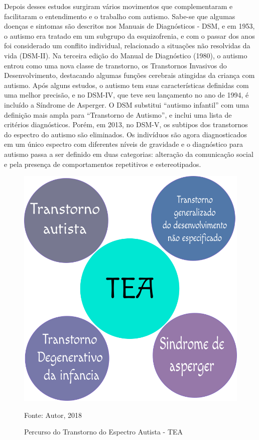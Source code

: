 		Depois desses estudos surgiram vários movimentos que complementaram e facilitaram o entendimento e o trabalho com autismo. Sabe-se que algumas doenças e sintomas são descritos nos Manuais de Diagnósticos - DSM, e em  1953, o autismo era tratado em um subgrupo da esquizofrenia, e com o passar dos anos foi considerado um conflito individual, relacionado a situações não resolvidas da vida (DSM-II). Na terceira edição do Manual de Diagnóstico (1980), o autismo entrou como uma nova classe de transtorno, os Transtornos Invasivos do Desenvolvimento, destacando algumas funções cerebrais atingidas da criança com autismo. 
		Após alguns estudos, o autismo tem suas características definidas com uma melhor precisão, e no DSM-IV, que teve seu lançamento no ano de 1994, é incluído a Síndrome de Asperger. O DSM substitui “autismo infantil” com uma definição mais ampla para “Transtorno de Autismo”, e inclui uma lista de critérios diagnósticos. Porém, em 2013, no DSM-V, os subtipos dos transtornos do espectro do autismo são eliminados. Os indivíduos são agora diagnosticados em um único espectro com diferentes níveis de gravidade e o diagnóstico para autismo passa a ser definido em duas categorias: alteração da comunicação social e pela presença de comportamentos repetitivos e estereotipados.
		
		\begin{figure}[H]
			\centering
			\includegraphics[scale=0.3]{img/tea-dsmv}
			\caption{Percurso do Transtorno do Espectro Autista - TEA}
			Fonte: Autor, 2018
			\label{fig:figura1}
		\end{figure}
		
